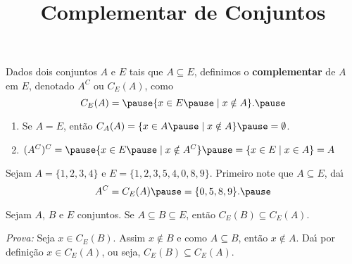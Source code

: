 \documentclass{beamer}
\title{Complementar de Conjuntos}
\author[\autor]{\autor}
\institute[\instituto]{\instituto}
\date{}
\begin{document}
    \begin{frame}
        \maketitle
    \end{frame}


    \begin{frame}
        \begin{definicao}
        Dados dois conjuntos $A$ e $E$ \pause tais que $A\subseteq E$, \pause definimos o \textbf{complementar} \pause de $A$ em $E$, denotado $A^C$ ou $C_E(A)$, como\pause
        \[
            C_E(A) = \pause \{ x \in E \pause \mid x \notin A \}.\pause
        \]
        \end{definicao}

        \begin{observacoes}
            \begin{enumerate}[label={\arabic*})]
                \item Se $A = E$, \pause ent{\~a}o $C_A(A) = \{ x \in A \pause \mid x \notin A \} \pause = \emptyset$.\pause
                \item $(A^C)^C = \pause \{x \in E \pause \mid x \notin A^C\} \pause = \{ x \in E \mid x \in A \} = A$\pause
            \end{enumerate}

        \end{observacoes}
    \end{frame}

    \begin{frame}
        \begin{exemplo}
            Sejam $A = \{1,2,3,4\}$ \pause e $E = \{1,2,3,5,4,0,8,9\}$. \pause Primeiro note que $A \subseteq E$, \pause da{\'\i}
            \[
                    A^C = C_E(A) \pause = \{0,5,8,9\}.\pause
            \]
        \end{exemplo}

        \begin{proposicao}
            Sejam $A$, $B$ e $E$ conjuntos. \pause Se $A\subseteq B\subseteq E$, \pause ent{\~a}o $C_E(B)\subseteq C_E(A)$.\pause
        \end{proposicao}
        \textit{Prova: }\pause
            Seja $x \in C_E(B)$. \pause Assim $x\notin B$ \pause e como $A \subseteq B$, \pause ent\~ao $x \notin A$. \pause Da{\'\i} por defini\c{c}\~ao $x\in C_E(A)$, \pause ou seja, $C_E(B) \subseteq C_E(A)$.\qedsymbol\pause
    \end{frame}
\end{document}
